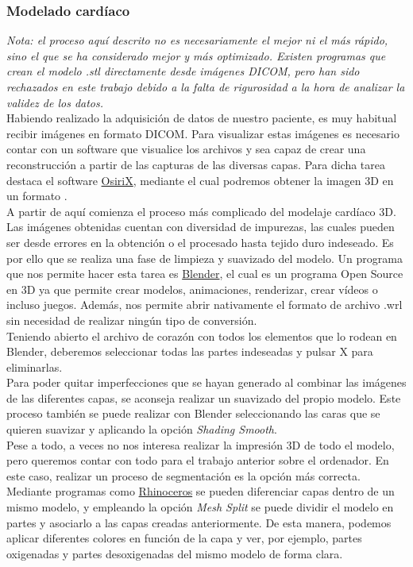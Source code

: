 \documentclass[a4paper,12pt]{article}
\begin{document}
\subsubsection{Modelado cardíaco}
\emph{Nota: el proceso aquí descrito no es necesariamente el mejor ni el más rápido, sino el que se ha considerado mejor y más optimizado. Existen programas que crean el modelo .stl directamente desde imágenes DICOM, pero han sido rechazados en este trabajo debido a la falta de rigurosidad a la hora de analizar la validez de los datos.}\\

Habiendo realizado la adquisición de datos de nuestro paciente, es muy habitual recibir imágenes en formato DICOM. Para visualizar estas imágenes es necesario contar con un software que visualice los archivos y sea capaz de crear una reconstrucción a partir de las capturas de las diversas capas. Para dicha tarea destaca el software \href{http://www.osirix-viewer.com/}{OsiriX}, mediante el cual podremos obtener la imagen 3D en un formato .\\

A partir de aquí comienza el proceso más complicado del modelaje cardíaco 3D. Las imágenes obtenidas cuentan con diversidad de impurezas, las cuales pueden ser desde errores en la obtención o el procesado hasta tejido duro indeseado. Es por ello que se realiza una fase de limpieza y suavizado del modelo. Un programa que nos permite hacer esta tarea es \href{https://www.blender.org/}{Blender}, el cual es un programa Open Source en 3D ya que permite crear modelos, animaciones, renderizar, crear vídeos o incluso juegos. Además, nos permite abrir nativamente el formato de archivo .wrl sin necesidad de realizar ningún tipo de conversión.\\

Teniendo abierto el archivo de corazón con todos los elementos que lo rodean en Blender, deberemos seleccionar todas las partes indeseadas y pulsar X para eliminarlas.\\

Para poder quitar imperfecciones que se hayan generado al combinar las imágenes de las diferentes capas, se aconseja realizar un suavizado del propio modelo. Este proceso también se puede realizar con Blender seleccionando las caras que se quieren suavizar y aplicando la opción \emph{Shading Smooth}.\\

Pese a todo, a veces no nos interesa realizar la impresión 3D de todo el modelo, pero queremos contar con todo para el trabajo anterior sobre el ordenador. En este caso, realizar un proceso de segmentación es la opción más correcta. Mediante programas como \href{https://www.rhino3d.com/}{Rhinoceros} se pueden diferenciar capas dentro de un mismo modelo, y empleando la opción \emph{Mesh Split} se puede dividir el modelo en partes y asociarlo a las capas creadas anteriormente. De esta manera, podemos aplicar diferentes colores en función de la capa y ver, por ejemplo, partes oxigenadas y partes desoxigenadas del mismo modelo de forma clara.\\
\end{document}
